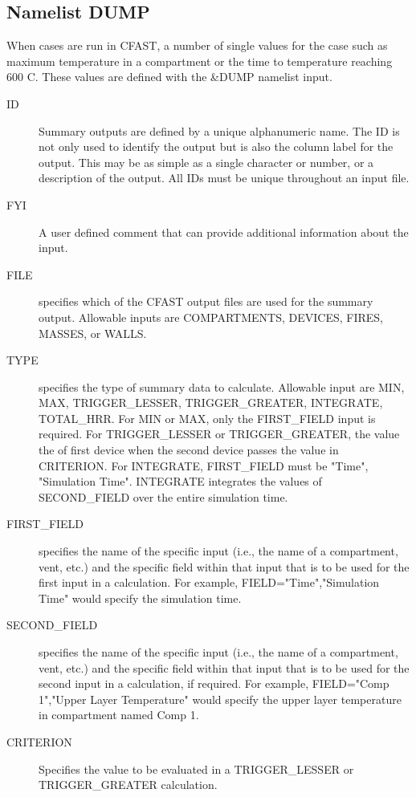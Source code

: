 \documentclass[12pt,twoside]{book}
\begin{document}
\subsection{Namelist DUMP}

When cases are run in CFAST, a number of single values for the case such as maximum temperature in a compartment or the time to temperature reaching 600 C. These values are defined with the {\ct \&DUMP} namelist input.

\begin{description}
  \item[ID] Summary outputs are defined by a unique alphanumeric name. The ID is not only used to identify the output but is also the column label for the output. This may be as simple as a single character or number, or a description of the output. All IDs must be unique throughout an input file.
  \item[FYI] A user defined comment that can provide additional information about the input.
  \item[FILE] specifies which of the CFAST output files are used for the summary output. Allowable inputs are {\ct COMPARTMENTS}, {\ct DEVICES}, {\ct FIRES}, {\ct MASSES}, or {\ct WALLS}.
  \item[TYPE] specifies the type of summary data to calculate. Allowable input are {\ct MIN}, {\ct MAX}, {\ct TRIGGER\_LESSER}, {\ct TRIGGER\_GREATER}, {\ct INTEGRATE}, {\ct TOTAL\_HRR}. For {\ct MIN} or {\ct MAX}, only the {\ct FIRST\_FIELD} input is required. For {\ct TRIGGER\_LESSER} or {\ct TRIGGER\_GREATER}, the value the of first device when the second device passes the value in {\ct CRITERION}. For {\ct INTEGRATE}, {\ct FIRST\_FIELD} must be {\ct "Time", "Simulation Time"}. {\ct INTEGRATE} integrates the values of {\ct SECOND\_FIELD} over the entire simulation time.
  \item[FIRST\_FIELD] specifies the name of the specific input (i.e., the name of a compartment, vent, etc.) and the specific field within that input that is to be used for the first input in a calculation. For example, {\ct FIELD="Time","Simulation Time"} would specify the simulation time.
  \item[SECOND\_FIELD] specifies the name of the specific input (i.e., the name of a compartment, vent, etc.) and the specific field within that input that is to be used for the second input in a calculation, if required. For example, {\ct FIELD="Comp 1","Upper Layer Temperature"} would specify the upper layer temperature in compartment named {\ct Comp 1}.
  \item[CRITERION] Specifies the value to be evaluated in a {\ct TRIGGER\_LESSER} or {\ct TRIGGER\_GREATER} calculation.
\end{description}
\end{document}
